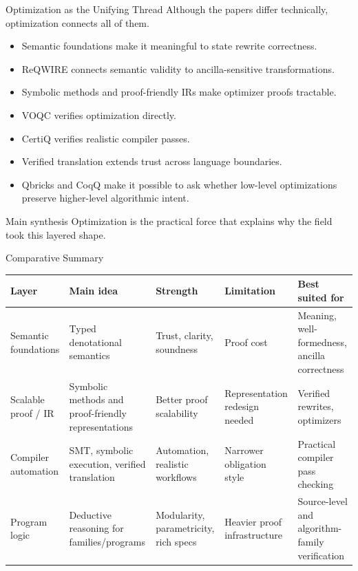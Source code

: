 \documentclass[aspectratio=169]{beamer}
\begin{document}
\begin{frame}{Optimization as the Unifying Thread}
\justifying
Although the papers differ technically, optimization connects all of them.

\vspace{0.5em}
\begin{itemize}
    \item Semantic foundations make it meaningful to state rewrite correctness.
    \item ReQWIRE connects semantic validity to ancilla-sensitive transformations.
    \item Symbolic methods and proof-friendly IRs make optimizer proofs tractable.
    \item VOQC verifies optimization directly.
    \item CertiQ verifies realistic compiler passes.
    \item Verified translation extends trust across language boundaries.
    \item Qbricks and CoqQ make it possible to ask whether low-level optimizations preserve higher-level algorithmic intent.
\end{itemize}

\pause

\begin{alertblock}{Main synthesis}
Optimization is the practical force that explains why the field took this layered shape.
\end{alertblock}
\end{frame}

\begin{frame}{Comparative Summary}
\centering
\scriptsize
\renewcommand{\arraystretch}{1.35}
\begin{tabular}{>{\raggedright\arraybackslash}p{2.2cm} >{\raggedright\arraybackslash}p{2.8cm} >{\raggedright\arraybackslash}p{2.7cm} >{\raggedright\arraybackslash}p{2.7cm} >{\raggedright\arraybackslash}p{2.2cm}}
\toprule
\textbf{Layer} & \textbf{Main idea} & \textbf{Strength} & \textbf{Limitation} & \textbf{Best suited for} \\
\midrule
Semantic foundations & Typed denotational semantics & Trust, clarity, soundness & Proof cost & Meaning, well-formedness, ancilla correctness \\
Scalable proof / IR & Symbolic methods and proof-friendly representations & Better proof scalability & Representation redesign needed & Verified rewrites, optimizers \\
Compiler automation & SMT, symbolic execution, verified translation & Automation, realistic workflows & Narrower obligation style & Practical compiler pass checking \\
Program logic & Deductive reasoning for families/programs & Modularity, parametricity, rich specs & Heavier proof infrastructure & Source-level and algorithm-family verification \\
\bottomrule
\end{tabular}
\end{frame}
\end{document}
